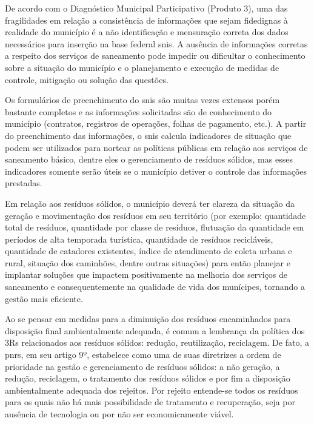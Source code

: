 \label{sec:metas}

De acordo com o Diagnóstico Municipal Participativo (Produto 3), uma das fragilidades em relação a consistência de informações que sejam fidedignas à realidade do município é a não identificação e mensuração correta dos dados necessários para inserção na base federal \gls{snis}. A ausência de informações corretas a respeito dos serviços de saneamento pode impedir ou dificultar o conhecimento sobre a situação do município e o planejamento e execução de medidas de controle, mitigação ou solução das questões.

Os formulários de preenchimento do \gls{snis} são muitas vezes extensos porém bastante completos e as informações solicitadas são de conhecimento do município (contratos, registros de operações, folhas de pagamento, etc.).	A partir do preenchimento das informações, o \gls{snis} calcula indicadores de situação que podem ser utilizados para nortear as políticas públicas em relação aos serviços de saneamento básico, dentre eles o gerenciamento de resíduos sólidos, mas esses indicadores somente serão úteis se o município detiver o controle das informações prestadas. 

Em relação aos resíduos sólidos, o município deverá ter clareza da situação da geração e movimentação dos resíduos em seu território (por exemplo: quantidade total de resíduos, quantidade por classe de resíduos, flutuação da quantidade em períodos de alta temporada turística, quantidade de resíduos recicláveis, quantidade de catadores existentes, índice de atendimento de coleta urbana e rural, situação dos caminhões, dentre outras situações) para então planejar e implantar soluções que impactem positivamente na melhoria dos serviços de saneamento e consequentemente na qualidade de vida dos munícipes, tornando a gestão mais eficiente.

Ao se pensar em medidas para a diminuição dos resíduos encaminhados para disposição final ambientalmente adequada, é comum a lembrança da política dos 3Rs relacionados aos resíduos sólidos: redução, reutilização, reciclagem. De fato, a \gls{pnrs}, em seu artigo 9º, estabelece como uma de suas diretrizes a ordem de prioridade na gestão e gerenciamento de resíduos sólidos: a não geração, a redução, reciclagem, o tratamento dos resíduos sólidos e por fim a disposição ambientalmente adequada dos rejeitos. \cite{brasil:12305} Por rejeito entende-se todos os resíduos para os quais não há mais possibilidade de tratamento e recuperação, seja por ausência de tecnologia ou por não ser economicamente viável.

